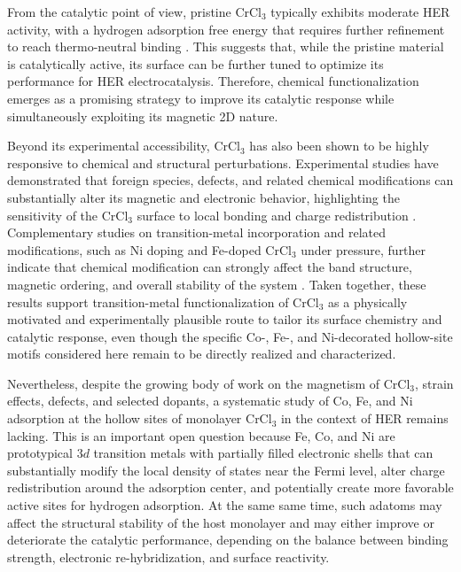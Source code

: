 \documentclass[a4paper,fleqn]{cas-dc}
\begin{document}
From the catalytic point of view, pristine CrCl$_3$ typically exhibits moderate HER activity, with a hydrogen adsorption free energy that requires further refinement to reach thermo-neutral binding \cite{Zala2024}. This suggests that, while the pristine material is catalytically active, its surface can be further tuned to optimize its performance for HER electrocatalysis. Therefore, chemical functionalization emerges as a promising strategy to improve its catalytic response while simultaneously exploiting its magnetic 2D nature.

Beyond its experimental accessibility, CrCl$_3$ has also been shown to be highly responsive to chemical and structural perturbations. Experimental studies have demonstrated that foreign species, defects, and related chemical modifications can substantially alter its magnetic and electronic behavior, highlighting the sensitivity of the CrCl$_3$ surface to local bonding and charge redistribution \cite{Luo2020,Gao2018,Mastrippolito2021,Mastrippolito2022}. Complementary studies on transition-metal incorporation and related modifications, such as Ni doping and Fe-doped CrCl$_3$ under pressure, further indicate that chemical modification can strongly affect the band structure, magnetic ordering, and overall stability of the system \cite{Wang2019,Abdel-Hafiez2025,Safi2023}. Taken together, these results support transition-metal functionalization of CrCl$_3$ as a physically motivated and experimentally plausible route to tailor its surface chemistry and catalytic response, even though the specific Co-, Fe-, and Ni-decorated hollow-site motifs considered here remain to be directly realized and characterized.

Nevertheless, despite the growing body of work on the magnetism of CrCl$_3$, strain effects, defects, and selected dopants, a systematic study of Co, Fe, and Ni adsorption at the hollow sites of monolayer CrCl$_3$ in the context of HER remains lacking. This is an important open question because Fe, Co, and Ni are prototypical $3d$ transition metals with partially filled electronic shells that can substantially modify the local density of states near the Fermi level, alter charge redistribution around the adsorption center, and potentially create more favorable active sites for hydrogen adsorption. At the same same time, such adatoms may affect the structural stability of the host monolayer and may either improve or deteriorate the catalytic performance, depending on the balance between binding strength, electronic re-hybridization, and surface reactivity.
\end{document}
